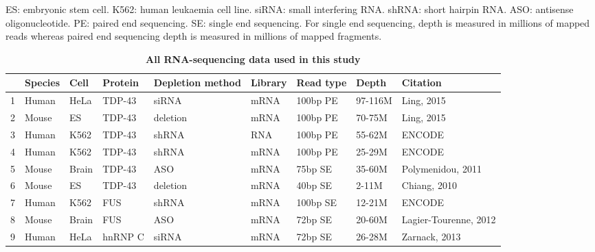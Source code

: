 
\begin{table}[h!]
	\caption{\textbf{All RNA-sequencing data used in this study}}
	ES: embryonic stem cell. K562: human leukaemia cell line. siRNA: small interfering RNA. shRNA: short hairpin RNA. ASO: antisense oligonucleotide. PE: paired end sequencing. SE: single end sequencing. 
	For single end sequencing, depth is measured in millions of mapped reads whereas paired end sequencing depth is measured in millions of mapped fragments.
	\label{table:cryptic_sequence_stats}
	\centering
	\begin{small}
		\begin{tabular}{llllp{1.5cm}llll}
			& Species & Cell & Protein & Depletion method & Library & Read type & Depth & Citation\\
			\hline
			1 & Human & HeLa & TDP-43 & siRNA & mRNA & 100bp PE & 97-116M & Ling, 2015\\
			2 & Mouse & ES & TDP-43 & deletion & mRNA & 100bp PE & 70-75M & Ling, 2015\\
			3 & Human & K562 & TDP-43 & shRNA & RNA & 100bp PE & 55-62M & ENCODE\\
			4 & Human & K562 & TDP-43 & shRNA & mRNA & 100bp PE & 25-29M & ENCODE\\
			5 & Mouse & Brain & TDP-43 & ASO & mRNA & 75bp SE & 35-60M & Polymenidou, 2011\\
			6 & Mouse & ES & TDP-43 & deletion & mRNA & 40bp SE & 2-11M & Chiang, 2010\\
			7 & Human & K562 & FUS & shRNA & mRNA & 100bp SE & 12-21M & ENCODE\\
			8 & Mouse & Brain & FUS & ASO & mRNA & 72bp SE & 20-60M & Lagier-Tourenne, 2012\\
			9 & Human & HeLa & hnRNP C & siRNA & mRNA & 72bp SE & 26-28M & Zarnack, 2013\\
		\end{tabular}
	\end{small}
\end{table}


